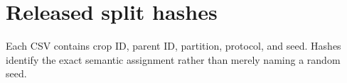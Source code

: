 \chapter{Released split hashes}\label{s1:ch:app05_released_split_hashes}

Each CSV contains crop ID, parent ID, partition, protocol, and seed. Hashes identify the exact semantic assignment rather than merely naming a random seed.

{\scriptsize
\setlength{\tabcolsep}{3pt}

}
